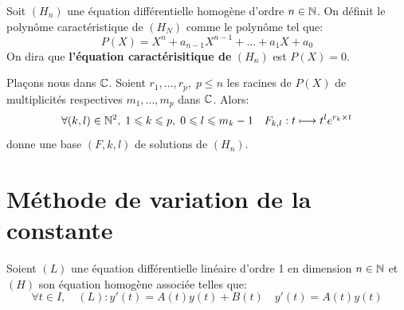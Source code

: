 \begin{definition}
	Soit $(H_n)$ une équation différentielle homogène d'ordre $ n \in  \mathbb{N}$. 
	On définit le polynôme caractéristique de $(H_N)$ comme le polynôme tel que: 
		\[ P(X) = X^n + a_{n-1} X^{n-1} + \dots + a_1 X + a_0 \] 
	On dira que \textbf{l'équation caractérisitique de} $(H_n)$ est $P(X) = 0$. 
\end{definition} 

\begin{theorem} 
	Plaçons nous dans $\mathbb{C}$. Soient $r_1, \dots, r_p, \; p \leqslant n$ les racines de $P(X)$ de multiplicités 
	respectives $m_1, \dots, m_p$ dans $\mathbb{C}$. Alors: 
		\[ \forall (k,l) \in  \mathbb{N}^2, \; 1 \leqslant k \leqslant p, \; 0 \leqslant l \leqslant m_k -1 
			\quad F_{k,l} : t \longmapsto t^l e^{r_k \times t} \]
	donne une base $(F,k,l)$ de solutions de $(H_n)$. 
\end{theorem} 



\section{Méthode de variation de la constante} 

Soient $(L)$ une équation différentielle linéaire d'ordre 1 en dimension $n \in  \mathbb{N}$
et $(H)$ son équation homogène associée telles que: 
	\[ \forall t \in I, \quad (L) : y'(t) = A(t) y(t) + B(t) \quad y'(t) = A(t) y(t) \] 







